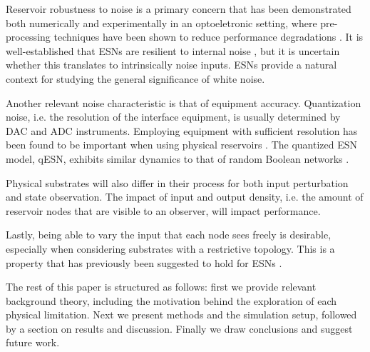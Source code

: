 Reservoir robustness to noise is a primary concern that has been demonstrated
both numerically and experimentally in an optoeletronic setting, where
pre-processing techniques have been shown to reduce performance degradations
\cite{soriano_optoelectronic_2013}. It is well-established that ESNs are
resilient to internal noise \cite{jaeger_echo_2001}, but it is uncertain whether
this translates to intrinsically noise inputs. ESNs provide a natural context
for studying the general significance of white noise.

Another relevant noise characteristic is that of equipment
accuracy. Quantization noise, i.e. the resolution of the interface equipment, is
usually determined by DAC and ADC instruments. Employing equipment with
sufficient resolution has been found to be important when using physical
reservoirs \cite{soriano_delay-based_2015}. The quantized ESN model, qESN,
exhibits similar dynamics to that of random Boolean networks
\cite{busing_connectivity_2010}.

Physical substrates will also differ in their process for both input
perturbation and state observation. The impact of input and output density,
i.e. the amount of reservoir nodes that are visible to an observer, will impact
performance.

Lastly, being able to vary the input that each node sees freely is desirable,
especially when considering substrates with a restrictive topology. This is a
property that has previously been suggested to hold for ESNs
\cite{jaeger_echo_2001}.

The rest of this paper is structured as follows: first we provide relevant
background theory, including the motivation behind the exploration of each
physical limitation. Next we present methods and the simulation setup, followed
by a section on results and discussion. Finally we draw conclusions and suggest
future work.

